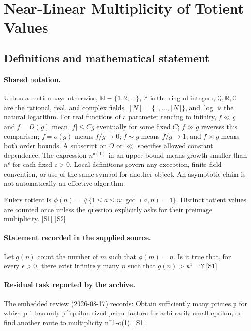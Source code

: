 \documentclass[11pt,a4paper]{article}
\newcommand{\N}{\mathbb{N}}
\newcommand{\Z}{\mathbb{Z}}
\newcommand{\Q}{\mathbb{Q}}
\newcommand{\R}{\mathbb{R}}
\newcommand{\C}{\mathbb{C}}
\newcommand{\sref}[2]{\hyperlink{source:#1:#2}{[S#2]}}
\begin{document}
\section{Near-Linear Multiplicity of Totient Values}\label{statement}


\subsection{Definitions and mathematical statement}

\paragraph{Shared notation.}Unless a section says otherwise, $\N=\{1,2,\ldots\}$,
$\Z$ is the ring of integers, $\Q,\R,\C$ are the rational, real, and complex
fields, $[N]=\{1,\ldots,\lfloor N\rfloor\}$, and $\log$ is the natural
logarithm. For real functions of a parameter tending to infinity,
$f\ll g$ and $f=O(g)$ mean $|f|\leq Cg$ eventually for some fixed $C$;
$f\gg g$ reverses this comparison; $f=o(g)$ means $f/g\to0$;
$f\sim g$ means $f/g\to1$; and $f\asymp g$ means both order bounds.
A subscript on $O$ or $\ll$ specifies allowed constant dependence.
The expression $n^{o(1)}$ in an upper bound means growth smaller than
$n^\epsilon$ for each fixed $\epsilon>0$. Local definitions govern any
exception, finite-field convention, or use of the same symbol for another
object. An asymptotic claim is not automatically an effective algorithm.



Euler\textquotesingle s totient is $\phi(n)=\#\{1\leq a\leq n:\gcd(a,n)=1\}$. Distinct totient values are counted once unless the question explicitly asks for their preimage multiplicity. \sref{statement}{1} \sref{statement}{2}

\paragraph{Statement recorded in the supplied source.}
Let $g(n)$ count the number of $m$ such that $\phi(m)=n$. Is it true that, for every $\epsilon>0$, there exist infinitely many $n$ such that $ g(n) > n^{1-\epsilon}? $ \sref{statement}{1}

\paragraph{Residual task reported by the archive.}

The embedded review (2026-08-17) records: Obtain sufficiently many primes p for which p-1 has only p\textasciicircum{}epsilon-sized prime factors for arbitrarily small epsilon, or find another route to multiplicity n\textasciicircum{}{1-o(1)}. \sref{statement}{1}
\end{document}
